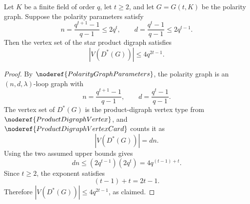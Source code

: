 \begin{helper}
Let \(K\) be a finite field of order \(q\), let \(t\ge2\), and let
\(G=G(t,K)\) be the polarity graph.  Suppose the polarity parameters satisfy
\[
  n=\frac{q^{t+1}-1}{q-1}\le 2q^t,\qquad
  d=\frac{q^t-1}{q-1}\le 2q^{t-1}.
\]
Then the vertex set of the star product digraph satisfies
\[
  |V(D^*(G))|\le 4q^{2t-1}.
\]
\end{helper}
\begin{proof}
By \(\noderef{PolarityGraphParameters}\), the polarity graph is an
\((n,d,\lambda)\)-loop graph with
\[
  n=\frac{q^{t+1}-1}{q-1},\qquad
  d=\frac{q^t-1}{q-1}.
\]
The vertex set of \(D^*(G)\) is the product-digraph vertex type from
\(\noderef{ProductDigraphVertex}\), and \(\noderef{ProductDigraphVertexCard}\)
counts it as
\[
  |V(D^*(G))|=dn.
\]
Using the two assumed upper bounds gives
\[
  dn\le (2q^{t-1})(2q^t)=4q^{(t-1)+t}.
\]
Since \(t\ge2\), the exponent satisfies
\[
  (t-1)+t=2t-1.
\]
Therefore \(|V(D^*(G))|\le4q^{2t-1}\), as claimed.
\end{proof}
